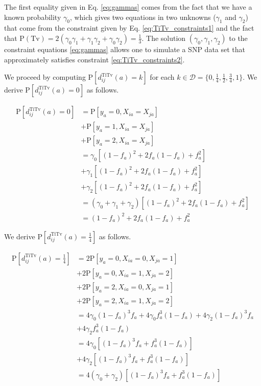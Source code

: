 \documentclass[10pt,letterpaper]{article}\usepackage[]{graphicx}\usepackage[]{color}
\begin{document}
The first equality given in Eq. \ref{eq:gammas} comes from the fact that we have a known probability $\gamma_0$, which gives two equations in two unknowns ($\gamma_1$ and $\gamma_2$) that come from the constraint given by Eq. \ref{eq:TiTv_constraints1} and the fact that $\text{P}(\text{Tv}) = 2(\gamma_0 \gamma_1 + \gamma_1 \gamma_2 + \gamma_0 \gamma_2) = \frac{1}{3}$. The solution $(\gamma_0,\gamma_1,\gamma_2)$ to the constraint equations \ref{eq:gammas} allows one to simulate a SNP data set that approximately satisfies constraint \ref{eq:TiTv_constraints2}.

We proceed by computing $\text{P}\left[d^\text{TiTv}_{ij}(a) = k\right]$ for each $k \in \mathcal{D} = \bigl\{0,\frac{1}{4},\frac{1}{2},\frac{3}{4},1\bigr\}$. We derive $\text{P}\left[d^\text{TiTv}_{ij}(a) = 0\right]$ as follows.

\begin{equation}\label{eq:prob_TiTv_0}
\begin{aligned}
\text{P}\left[d^\text{TiTv}_{ij}(a) = 0\right] &= \text{P}\left[y_a = 0, X_{ia} = X_{ja}\right] \\
&+ \text{P}\left[y_a = 1, X_{ia} = X_{ja}\right] \\
&+ \text{P}\left[y_a = 2, X_{ia} = X_{ja}\right] \\
&= \gamma_0 \left[(1 - f_a)^2 + 2 f_a (1 - f_a) + f^2_a\right] \\
&+ \gamma_1 \left[(1 - f_a)^2 + 2 f_a (1 - f_a) + f^2_a\right] \\
&+ \gamma_2 \left[(1 - f_a)^2 + 2 f_a (1 - f_a) + f^2_a\right] \\
&= (\gamma_0 + \gamma_1 + \gamma_2)\left[(1 - f_a)^2 + 2 f_a (1 - f_a) + f^2_a\right] \\
&= (1 - f_a)^2 + 2 f_a (1 - f_a) + f^2_a
\end{aligned}
\end{equation}

We derive $\text{P}\left[d^\text{TiTv}_{ij}(a) = \frac{1}{4}\right]$ as follows.

\begin{equation}\label{eq:prob_TiTv_0.25}
\begin{aligned}
\text{P}\left[d^\text{TiTv}_{ij}(a) = \frac{1}{4}\right] &= 2 \text{P}\left[y_a = 0, X_{ia} = 0, X_{ja} = 1\right] \\
&+ 2 \text{P}\left[y_a = 0, X_{ia} = 1, X_{ja} = 2\right] \\
&+ 2 \text{P}\left[y_a = 2, X_{ia} = 0, X_{ja} = 1\right] \\
&+ 2 \text{P}\left[y_a = 2, X_{ia} = 1, X_{ja} = 2\right] \\
&= 4 \gamma_0 (1 - f_a)^3 f_a + 4 \gamma_0 f^3_a (1 - f_a) + 4 \gamma_2 (1 - f_a)^3 f_a \\
&+ 4 \gamma_2 f^3_a (1 - f_a) \\
&= 4 \gamma_0 \left[(1 - f_a)^3 f_a + f^3_a (1 - f_a)\right] \\
&+ 4 \gamma_2 \left[(1 - f_a)^3 f_a + f^3_a (1 - f_a)\right] \\
&= 4(\gamma_0 + \gamma_2)\left[(1 - f_a)^3 f_a + f^3_a (1 - f_a)\right]
\end{aligned}
\end{equation}
\end{document}
